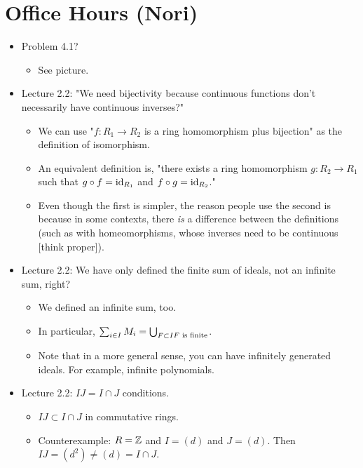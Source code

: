 \documentclass[../notes.tex]{subfiles}
\begin{document}
\section{Office Hours (Nori)}
\begin{itemize}
    \item Problem 4.1?
    \begin{itemize}
        \item See picture.
    \end{itemize}
    \item Lecture 2.2: "We need bijectivity because continuous functions don't necessarily have continuous inverses?"
    \begin{itemize}
        \item We can use "$f:R_1\to R_2$ is a ring homomorphism plus bijection" as the definition of isomorphism.
        \item An equivalent definition is, "there exists a ring homomorphism $g:R_2\to R_1$ such that $g\circ f=\operatorname{id}_{R_1}$ and $f\circ g=\operatorname{id}_{R_2}$."
        \item Even though the first is simpler, the reason people use the second is because in some contexts, there \emph{is} a difference between the definitions (such as with homeomorphisms, whose inverses need to be continuous [think proper]).
    \end{itemize}
    \item Lecture 2.2: We have only defined the finite sum of ideals, not an infinite sum, right?
    \begin{itemize}
        \item We defined an infinite sum, too.
        \item In particular, $\sum_{i\in I}M_i=\bigcup_{\substack{F\subset I}\\F\text{ is finite}}$.
        \item Note that in a more general sense, you can have infinitely generated ideals. For example, infinite polynomials.
    \end{itemize}
    \item Lecture 2.2: $IJ=I\cap J$ conditions.
    \begin{itemize}
        \item $IJ\subset I\cap J$ in commutative rings.
        \item Counterexample: $R=\mathbb{Z}$ and $I=(d)$ and $J=(d)$. Then $IJ=(d^2)\neq(d)=I\cap J$.

\end{itemize}
\end{itemize}
\end{document}

